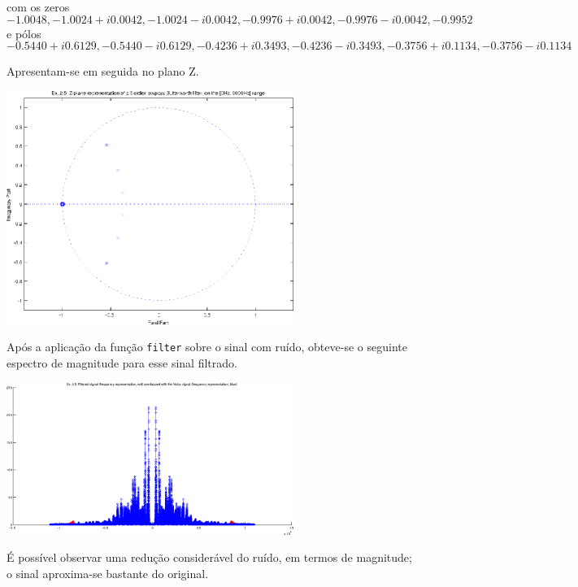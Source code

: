 \documentclass[a4paper]{article}
\begin{document}
\noindent com os zeros \[-1.0048, -1.0024 + i0.0042, -1.0024 - i0.0042, -0.9976 + i0.0042, -0.9976 - i0.0042, -0.9952\] e pólos \[-0.5440 + i0.6129, -0.5440 - i0.6129, -0.4236 + i0.3493, -0.4236 - i0.3493, -0.3756 + i0.1134, -0.3756 - i0.1134\]

\clearpage

\noindent Apresentam-se em seguida no plano Z.
\begin{center}
	\includegraphics[width=0.70\textwidth]{images/ex_2_5_lowpass_zplane.png}
	\label{fig:ex_2_5_lowpass_zplane}
\end{center}

\noindent Após a aplicação da função \texttt{filter} sobre o sinal com ruído, obteve-se o seguinte espectro de magnitude para esse sinal filtrado.
\begin{center}
	\includegraphics[width=0.70\textwidth]{images/ex_2_5_lowpass_spectrum.png}
	\label{fig:ex_2_5_lowpass_spectrum}
\end{center}

\noindent É possível observar uma redução considerável do ruído, em termos de magnitude; o sinal aproxima-se bastante do original.
\end{document}
